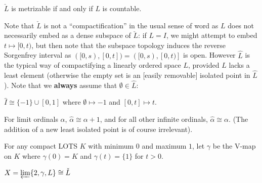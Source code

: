 \documentclass[11pt]{article}
\begin{document}
  \begin{corollary}
    \(\check L\) is metrizable if and only if \(L\) is countable.
  \end{corollary}

  Note that \(\check L\)
  is not a ``compactification'' in the usual sense of word
  as \(L\) does not necessarily
  embed as a dense subspace of \(\check L\): if \(L=I\), we might attempt to embed
  \(t\mapsto [0,t)\), but then note that the subspace topology induces the
  reverse Sorgenfrey interval as \(([0,s),[0,t])=([0,s),[0,t)]\) is open.
  However \(\hat L\) is
  the typical way of compactifying a linearly ordered space \(L\),
  provided \(L\) lacks a least element (otherwise the empty set is an [easily
  removable] isolated point in \(\hat L\)). Note that we \textbf{always}
  assume that \(\emptyset\in\hat L\):

  \begin{example}
    \(\hat I\cong\{-1\}\cup [0,1]\) where
    \(\emptyset\mapsto-1\) and \([0,t]\mapsto t\).
  \end{example}

  \begin{example}
    For limit ordinals \(\alpha\), \(\hat \alpha\cong \alpha+1\),
    and for all other infinite ordinals, \(\hat\alpha\cong\alpha\).
    (The addition of a new least isolated point is of course irrelevant).
  \end{example}

  \begin{definition}
    For any compact LOTS \(K\) with minimum \(0\) and maximum \(1\),
    let \(\gamma\) be the V-map on \(K\) where \(\gamma(0)=K\) and \(\gamma(t)=\{1\}\)
    for \(t>0\).
  \end{definition}

  \begin{theorem}
    \(X=\varprojlim \{2, \gamma, L\}\cong \check L\)
  \end{theorem}
\end{document}
